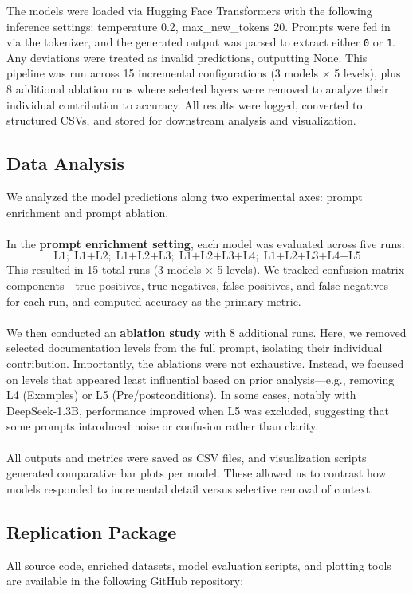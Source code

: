 \documentclass[a4paper]{usiinfbachelorproject}
\begin{document}
The models were loaded via Hugging Face Transformers with the following inference settings: temperature 0.2, max\_new\_tokens 20. Prompts were fed in via the tokenizer, and the generated output was parsed to extract either \texttt{0} or \texttt{1}. Any deviations were treated as invalid predictions, outputting None. This pipeline was run across 15 incremental configurations (3 models × 5 levels), plus 8 additional ablation runs where selected layers were removed to analyze their individual contribution to accuracy. All results were logged, converted to structured CSVs, and stored for downstream analysis and visualization.


\subsection{Data Analysis}\label{sec:analysis}
We analyzed the model predictions along two experimental axes: prompt enrichment and prompt ablation.\\
\\[2pt]
In the \textbf{prompt enrichment setting}, each model was evaluated across five runs:
\[
\text{L1};\; \text{L1+L2};\; \text{L1+L2+L3};\; \text{L1+L2+L3+L4};\; \text{L1+L2+L3+L4+L5}
\]
This resulted in 15 total runs (3 models × 5 levels). We tracked confusion matrix components—true positives, true negatives, false positives, and false negatives—for each run, and computed accuracy as the primary metric.\\
\\[2pt]
We then conducted an \textbf{ablation study} with 8 additional runs. Here, we removed selected documentation levels from the full prompt, isolating their individual contribution. Importantly, the ablations were not exhaustive. Instead, we focused on levels that appeared least influential based on prior analysis—e.g., removing L4 (Examples) or L5 (Pre/postconditions). In some cases, notably with DeepSeek-1.3B, performance improved when L5 was excluded, suggesting that some prompts introduced noise or confusion rather than clarity.\\
\\[2pt]All outputs and metrics were saved as CSV files, and visualization scripts generated comparative bar plots per model. These allowed us to contrast how models responded to incremental detail versus selective removal of context.

\subsection{Replication Package}\label{sec:replication}
All source code, enriched datasets, model evaluation scripts, and plotting tools are available in the following GitHub repository:
\end{document}
